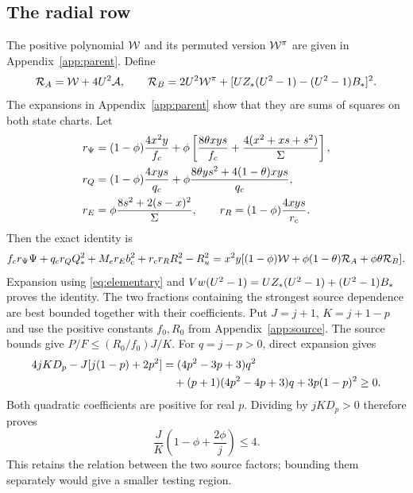 \subsection*{The radial row}
The positive polynomial $\mathcal W$ and its permuted version $\mathcal W^\pi$ are given
in Appendix~\ref{app:parent}. Define
\[
 \mathcal R_A=\mathcal W+4U^2\mathcal A,\qquad
 \mathcal R_B=2U^2\mathcal W^\pi+
       [UZ_*(U^2-1)-(U^2-1)B_*]^2 .
\]
The expansions in Appendix~\ref{app:parent} show that they are sums of
squares on both state charts.
Let
\begin{align}
 r_\Psi&=(1-\phi)\frac{4x^2y}{f_c}
       +\phi\left[\frac{8\theta xys}{f_c}
                     +\frac{4(x^2+xs+s^2)}{\Sigma}\right],\notag\\
 r_Q&=(1-\phi)\frac{4xys}{q_c}
        +\phi\frac{8\theta ys^2+4(1-\theta)xys}{q_c},\notag\\
 r_E&=\phi\frac{8s^2+2(s-x)^2}{\Sigma},\qquad
 r_R=(1-\phi)\frac{4xys}{r_c}.
 \label{eq:radialfractions}
\end{align}
Then the exact identity is
\begin{align}
 f_cr_\Psi\Psi+q_cr_QQ_*^2+M_er_Eb_{\mathrm c}^2+r_cr_RR_*^2-R_u^2
 =x^2y[(1-\phi)\mathcal W+\phi(1-\theta)\mathcal R_A
                                      +\phi\theta\mathcal R_B].
 \label{eq:radialpurchase}
\end{align}
Expansion using \eqref{eq:elementary} and
$Vw(U^2-1)=UZ_*(U^2-1)+(U^2-1)B_*$ proves the identity.
The two fractions containing the strongest source dependence are best
bounded together with their coefficients. Put $J=j+1$, $K=j+1-p$ and
use the positive constants $f_0,R_0$ from Appendix~\ref{app:source}.
The source bounds give $P/F\leq (R_0/f_0)J/K$.
For $q=j-p>0$, direct expansion gives
\begin{align}
 4jKD_p-J[j(1-p)+2p^2]
  &=(4p^2-3p+3)q^2\notag\\
  &\quad +(p+1)(4p^2-4p+3)q+3p(1-p)^2\geq0.
 \label{eq:jointsource}
\end{align}
Both quadratic coefficients are positive for real $p$. Dividing by
$jKD_p>0$ therefore proves
\[
 \frac JK\left(1-\phi+\frac{2\phi}{j}\right)\leq4.
\]
This retains the relation between the two source factors; bounding them
separately would give a smaller testing region.

